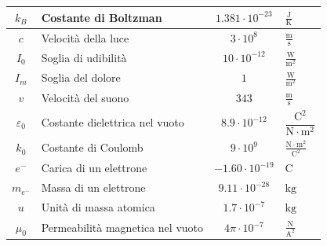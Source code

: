 \documentclass[8pt, a4paper, twocolumn, twoside]{extarticle}
\begin{document}
\begin{center}
\begin{xtabular}{c M{1.8cm} c M{1.5cm}}
    \label{tab:kB} 
    $k_B$ & Costante di Boltzman & $1.381\cdot10^{-23}$ & 
    $\frac{\text{J}}{\text{K}}$\\ \midrule
    \label{tab:c} 
    $c$ & Velocità della luce & $3\cdot10^8$ & $\frac{\text{m}}{\text{s}}$\\\midrule
    \label{tab:I0} 
    $I_0$ & Soglia di udibilità & $10\cdot10^{-12}$ & 
    $\frac{\text{W}}{\text{m}^2}$\\ \midrule
    \label{tab:Im} 
    $I_m$ & Soglia del dolore & $1$ & $\frac{\text{W}}{\text{m}^2}$\\ \midrule
    \label{tab:vs} 
    $v$ & Velocità del suono & $343$ & $\frac{\text{m}}{\text{s}}$\\ \midrule
    \label{tab:e0} 
    $\varepsilon_0$& Costante dielettrica nel vuoto&$8.9\cdot10^{-12}$&
    $\dfrac{\text{C}^2}{\text{N}\cdot\text{m}^2}$\\ \midrule
    \label{tab:k0}
    $k_0$ & Costante di Coulomb & $9\cdot10^9$ & 
    $\frac{\text{N}\cdot\text{m}^2}{\text{C}^2}$\\ \midrule
    \label{tab:e-} 
    $e^{-}$ & Carica di un elettrone & $-1.60\cdot10^{-19}$ & $\text{C}$\\ \midrule
    \label{tab:me-} 
    $m_{e^{-}}$ & Massa di un elettrone & $9.11\cdot10^{-28}$ & $\text{kg}$\\\midrule
    \label{tab:u} 
    $u$ & Unità di massa atomica & $1.7\cdot10^{-7}$ & $\text{kg}$\\\midrule
    \label{tab:mu0} 
    $\mu_0$ & Permeabilità magnetica nel vuoto & $4\pi\cdot10^{-7}$ & 
    $\frac{\text{N}}{\text{A}^2}$\\
    \midrule
  \end{xtabular}
\end{center}

\newpage
\end{document}
